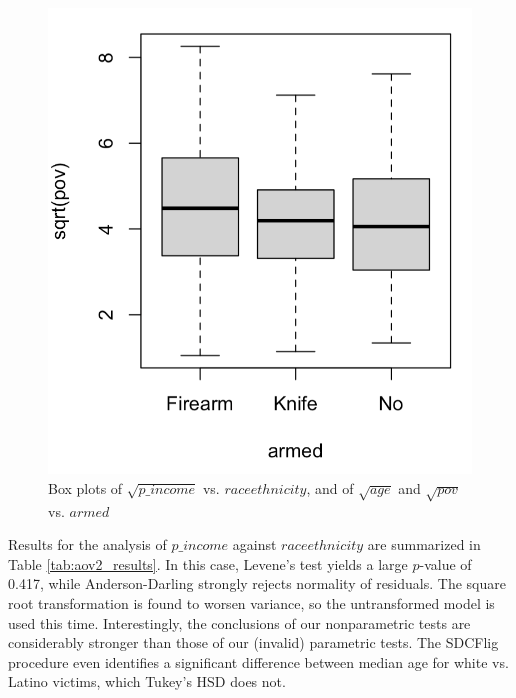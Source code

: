 \begin{figure}[h]
    \includegraphics[scale=.35]{boxplot_pov_armed.png}
    \caption{Box plots of $\sqrt{p\_income}$ vs. $raceethnicity$, and of $\sqrt{age}$ and $\sqrt{pov}$ vs. $armed$}
    \label{fig:aov234_boxplots}
\end{figure}

Results for the analysis of $p\_income$ against $raceethnicity$ are summarized in Table \ref{tab:aov2_results}. In this case, Levene's test yields a large $p$-value of 0.417, while Anderson-Darling strongly rejects normality of residuals. The square root transformation is found to worsen variance, so the untransformed model is used this time. Interestingly, the conclusions of our nonparametric tests are considerably stronger than those of our (invalid) parametric tests. The SDCFlig procedure even identifies a significant difference between median age for white vs. Latino victims, which Tukey's HSD does not.

